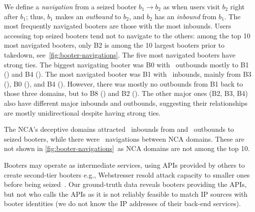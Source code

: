 \documentclass[letterpaper,twocolumn,10pt]{article}
\begin{document}
We define a \textit{navigation} from a seized booter $b_1 \rightarrow b_2$ as when users visit $b_2$ right after $b_1$; thus, $b_1$ makes an \textit{outbound} to $b_2$, and $b_2$ has an \textit{inbound} from $b_1$. The most frequently navigated booters are those with the most inbounds. Users accessing top seized booters tend not to navigate to the others: among the top 10 most navigated booters, only B2 is among the 10 largest booters prior to takedown, see~\autoref{fig:booter-navigations}. The five most navigated booters have strong ties. The biggest navigating booter was B0 with \BTNavigationCountsFromipstressercom~outbounds mostly to B1 (\BTNavigationCountsFromipstressercomToinstantstressercom) and B4 (\BTNavigationCountsFromipstressercomTofreestresserso). The most navigated booter was B1 with \BTNavigationCountsToinstantstressercom~inbounds, mainly from B3 (\BTNavigationCountsFrombootyounetToinstantstressercom), B0 (\BTNavigationCountsFromipstressercomToinstantstressercom), and B4 (\BTNavigationCountsFromfreestressersoToinstantstressercom). However, there was mostly no outbounds from B1 back to those three domains, but to B8 (\BTNavigationCountsFrominstantstressercomTostresseraicom) and B2 (\BTNavigationCountsFrominstantstressercomTostresserapp). The other major ones (B2, B3, B4) also have different major inbounds and outbounds, suggesting their relationships are mostly unidirectional despite having strong ties.

The NCA's deceptive domains attracted \BTNavigationCountsToNCADomains~inbounds from and \BTNavigationCountsFromNCADomains~outbounds to seized booters, while there were \BTNavigationCountsWithinAllNCADomains~navigations between NCA domains. These are not shown in \autoref{fig:booter-navigations}~as NCA domains are not among the top 10.

 Booters may operate as intermediate services, using APIs provided by others to create second-tier booters e.g., Webstresser resold attack capacity to smaller ones before being seized~\cite{collier2020cybercrime}. Our ground-truth data reveals booters providing the APIs, but not who calls the APIs as it is not reliably feasible to match IP sources with booter identities (we do not know the IP addresses of their back-end services). 
\end{document}
